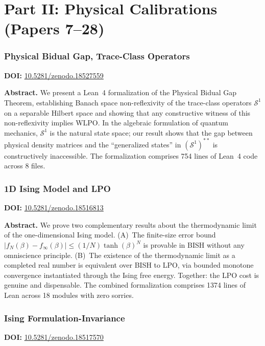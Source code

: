 \documentclass[11pt,a4paper]{article}
\begin{document}
\part*{Part II: Physical Calibrations (Papers 7--28)}

\section{Physical Bidual Gap, Trace-Class Operators}
\label{sec:p7}
\textbf{DOI:} \href{https://doi.org/10.5281/zenodo.18527559}{10.5281/zenodo.18527559}

\bigskip
\noindent\textbf{Abstract.}
We present a Lean~4 formalization of the Physical Bidual Gap Theorem, establishing Banach space non-reflexivity of the trace-class operators $\mathcal{S}^1$ on a separable Hilbert space and showing that any constructive witness of this non-reflexivity implies WLPO. In the algebraic formulation of quantum mechanics, $\mathcal{S}^1$ is the natural state space; our result shows that the gap between physical density matrices and the ``generalized states'' in $(\mathcal{S}^1)^{**}$ is constructively inaccessible. The formalization comprises 754 lines of Lean~4 code across 8 files.

\section{1D Ising Model and LPO}
\label{sec:p8}
\textbf{DOI:} \href{https://doi.org/10.5281/zenodo.18516813}{10.5281/zenodo.18516813}

\bigskip
\noindent\textbf{Abstract.}
We prove two complementary results about the thermodynamic limit of the one-dimensional Ising model. (A)~The finite-size error bound $|f_N(\beta)-f_\infty(\beta)|\le(1/N)\tanh(\beta)^N$ is provable in BISH without any omniscience principle. (B)~The existence of the thermodynamic limit as a completed real number is equivalent over BISH to LPO, via bounded monotone convergence instantiated through the Ising free energy. Together: the LPO cost is genuine and dispensable. The combined formalization comprises 1374 lines of Lean across 18 modules with zero sorries.

\section{Ising Formulation-Invariance}
\label{sec:p9}
\textbf{DOI:} \href{https://doi.org/10.5281/zenodo.18517570}{10.5281/zenodo.18517570}
\end{document}
